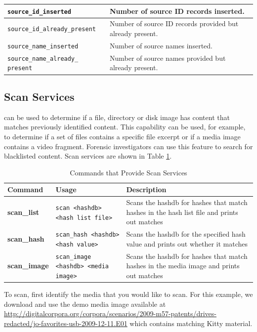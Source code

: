 \documentclass[11pt,fleqn]{article} %
\begin{document}
\begin{table}[!ht]
\begin{tabular}{|p{5 cm}|p{8.8 cm}|}
\verb+source_id_inserted+ &  Number of source ID records inserted.\\
\hline
\verb+source_id_already_present+ &  Number of source ID records provided but already present.\\
\hline

\verb+source_name_inserted+ &  Number of source names inserted.\\
\hline
\verb+source_name_already_+ \verb+present+ &  Number of source names provided but already present.\\
\hline
\end{tabular}
\end{table}

\subsection{Scan Services}
\label{ScanServices}
\hdb can be used to determine if a file, directory or disk image has content that matches previously identified content. This capability can be used, for example, to determine if a set of files contains a specific file excerpt or if a media image contains a video fragment. Forensic investigators can use this feature to search for blacklisted content.
Scan services are shown in Table \ref{tab:scanServices}. \\

\begin{table}[!ht]
\centering
\caption{Commands that Provide Scan Services}
\label{tab:scanServices}
\begin{tabular}{|p{3.5 cm}|p{6 cm}|p{4 cm}|}
\hline \hline
\textbf{Command} & \textbf{Usage} & \textbf{Description} \\
\hline
\textbf{scan\_list} & \verb+scan <hashdb>+ \verb+<hash list file>+ & Scans the hashdb for hashes that match hashes in the hash list file and prints out matches\\
\hline
\textbf{scan\_hash} & \verb+scan_hash <hashdb>+ \verb+<hash value>+ & Scans the hashdb for the specified hash value and prints out whether it matches\\
\hline
\textbf{scan\_image} & \verb+scan_image+ \verb+<hashdb> <media image>+ & Scans the hashdb for hashes that match hashes in the media image and prints out matches\\
\hline
\end{tabular}
\end{table}

To scan, first identify the media that you would like to scan. For this example, we download and use the demo media image available at \url{ http://digitalcorpora.org/corpora/scenarios/2009-m57-patents/drives-redacted/jo-favorites-usb-2009-12-11.E01} which contains matching Kitty material.\\
\end{document}
